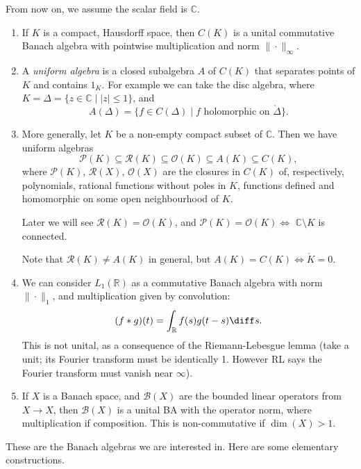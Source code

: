 \documentclass[12pt]{article}
\begin{document}
From now on, we assume the scalar field is $\mathbb{C}$.

\begin{exbox}
	\begin{enumerate}
		\item If $K$ is a compact, Hausdorff space, then $C(K)$ is a unital commutative Banach algebra with pointwise multiplication and norm $\|\cdot\|_\infty$.
		\item A \emph{uniform algebra} is a closed subalgebra $A$ of $C(K)$ that separates points of $K$ and contains $1_K$. For example we can take the disc algebra, where $K = \Delta = \{z \in \mathbb{C} \mid |z| \leq 1\}$, and
			\[
				A(\Delta) = \{f \in C(\Delta) \mid f \text{ holomorphic on } \mathring \Delta\}.
			\]
		\item More generally, let $K$ be a non-empty compact subset of $\mathbb{C}$. Then we have uniform algebras
			\[
			\mathcal{P}(K) \subseteq \mathcal{R}(K) \subseteq \mathcal{O}(K) \subseteq A(K) \subseteq C(K),
			\]
			where $\mathcal{P}(K)$, $\mathcal{R}(X)$, $\mathcal{O}(X)$ are the closures in $C(K)$ of, respectively, polynomials, rational functions without poles in $K$, functions defined and homomorphic on some open neighbourhood of $K$.

			Later we will see $\mathcal{R}(K) = \mathcal{O}(K)$, and $\mathcal{P}(K) = \mathcal{O}(K) \iff$ $\mathbb{C} \setminus K$ is connected.

			Note that $\mathcal{R}(K) \neq A(K)$ in general, but $A(K) = C(K) \iff \mathring K = 0$.
		\item We can consider $L_1(\mathbb{R})$ as a commutative Banach algebra with norm $\|\cdot\|_1$, and multiplication given by convolution:
			\[
				(f \ast g)(t) = \int_{\mathbb{R}} f(s) g(t - s) \diff s.
			\]
			This is not unital, as a consequence of the Riemann-Lebesgue lemma (take a unit; its Fourier transform must be identically 1. However RL says the Fourier transform must vanish near $\infty$).
		\item If $X$ is a Banach space, and $\mathcal{B}(X)$ are the bounded linear operators from $X \to X$, then $\mathcal{B}(X)$ is a unital BA with the operator norm, where multiplication if composition. This is non-commutative if $\dim(X) > 1$.
	\end{enumerate}
\end{exbox}

These are the Banach algebras we are interested in. Here are some elementary constructions.
\end{document}
